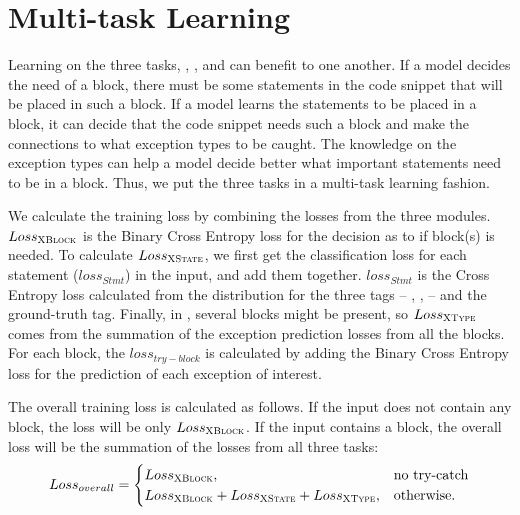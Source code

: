 \section{Multi-task Learning}
\label{sec:multitasking}

Learning on the three tasks, {\xblock}, {\xstate}, and {\xtype}
can benefit to one another. If a model decides the need
of a  block, there must be some statements in the code
snippet that will be placed in such a block. If a model learns the
statements to be placed in a  block, it can decide
that the code snippet needs such a block and make the connections to
what exception types to be caught. The knowledge on the exception
types can help a model decide better what important statements need to
be in a  block. Thus, we put the three tasks
in a multi-task learning fashion.


We calculate the training loss by combining the losses from the three
modules. $Loss_{{\textsc{XBlock}}}$ is the Binary Cross Entropy loss for the
decision as to if  block(s) is needed. To
calculate $Loss_{{\textsc{XState}}}$, we first get the classification loss for
each statement ($loss_{Stmt}$) in the input, and add them
together. $loss_{Stmt}$ is the Cross Entropy loss calculated from the
distribution for the three tags -- , ,
 -- and the ground-truth tag. Finally, in \xtype, several
 blocks might be present, so $Loss_{{\textsc{XType}}}$ comes
from the summation of the exception prediction losses from all the
 blocks. For each  block, the
$loss_{try-block}$ is calculated by adding the Binary Cross Entropy
loss for the prediction of each exception of interest.

The overall training loss is calculated as follows. If the input does
not contain any  block, the loss will be only 
$Loss_{{\textsc{XBlock}}}$. If the input contains a  block,
the overall loss will be the summation of the losses from all
three tasks:
\begin{equation}
\label{eqn:loss}
Loss_{overall} =
\begin{cases}
Loss_{{\textsc{XBlock}}},  & \text{no try-catch}\\
Loss_{{\textsc{XBlock}}} + Loss_{{\textsc{XState}}} + Loss_{{\textsc{XType}}}, &\text{otherwise.}
\end{cases}
\end{equation}
